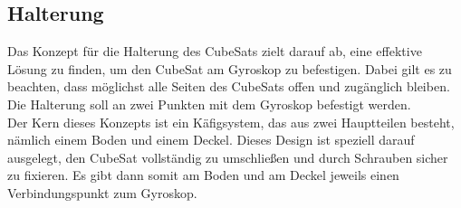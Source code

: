 \subsection{Halterung}\label{sec: Halterung}
Das Konzept für die Halterung des CubeSats zielt darauf ab, eine effektive Lösung zu finden, um den CubeSat am Gyroskop zu befestigen. Dabei gilt es zu beachten, dass möglichst alle Seiten des CubeSats offen und zugänglich bleiben. Die Halterung soll an zwei Punkten mit dem Gyroskop befestigt werden. \\
\vspace{3mm}
Der Kern dieses Konzepts ist ein Käfigsystem, das aus zwei Hauptteilen besteht, nämlich einem Boden und einem Deckel. Dieses Design ist speziell darauf ausgelegt, den CubeSat vollständig zu umschließen und durch Schrauben sicher zu fixieren. Es gibt dann somit am Boden und am Deckel jeweils einen Verbindungspunkt zum Gyroskop.\\
